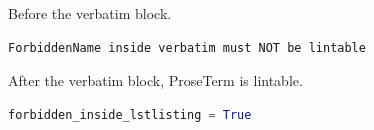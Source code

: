 Before the verbatim block.
\begin{verbatim}
ForbiddenName inside verbatim must NOT be lintable
\end{verbatim}
After the verbatim block, ProseTerm is lintable.
\begin{lstlisting}[language=Python]
forbidden_inside_lstlisting = True
\end{lstlisting}
